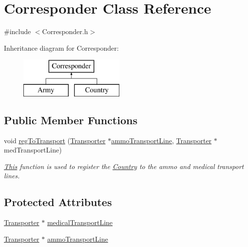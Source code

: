 \hypertarget{class_corresponder}{}\section{Corresponder Class Reference}
\label{class_corresponder}


{\ttfamily \#include $<$Corresponder.\+h$>$}

Inheritance diagram for Corresponder\+:\begin{figure}[H]
\begin{center}
\leavevmode
\includegraphics[height=2.000000cm]{class_corresponder}
\end{center}
\end{figure}
\subsection*{Public Member Functions}
\begin{DoxyCompactItemize}
\item 
void \mbox{\hyperlink{class_corresponder_a77d76ef09fc2484cd5c84b1cc96bfe9c}{reg\+To\+Transport}} (\mbox{\hyperlink{class_transporter}{Transporter}} $\ast$\mbox{\hyperlink{class_corresponder_ade2405746074c8e6eed17cf4c1c79c70}{ammo\+Transport\+Line}}, \mbox{\hyperlink{class_transporter}{Transporter}} $\ast$med\+Transport\+Line)
\begin{DoxyCompactList}\small\item\em \mbox{\hyperlink{class_this}{This}} function is used to register the \mbox{\hyperlink{class_country}{Country}} to the ammo and medical transport lines. \end{DoxyCompactList}\end{DoxyCompactItemize}
\subsection*{Protected Attributes}
\begin{DoxyCompactItemize}
\item 
\mbox{\hyperlink{class_transporter}{Transporter}} $\ast$ \mbox{\hyperlink{class_corresponder_a1149aea3efe857bd51c3abf2dea0f8c1}{medical\+Transport\+Line}}
\item 
\mbox{\hyperlink{class_transporter}{Transporter}} $\ast$ \mbox{\hyperlink{class_corresponder_ade2405746074c8e6eed17cf4c1c79c70}{ammo\+Transport\+Line}}
\end{DoxyCompactItemize}


